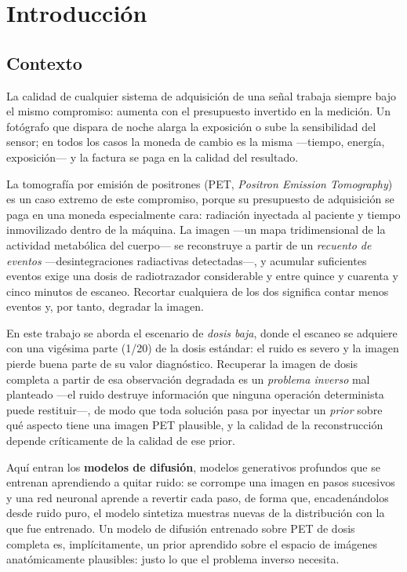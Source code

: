 \chapter{Introducción}
\label{cap:introduccion}

\section{Contexto}
\label{sec:contexto}

La calidad de cualquier sistema de adquisición de una señal trabaja
siempre bajo el mismo compromiso: aumenta con el presupuesto invertido
en la medición. Un fotógrafo que dispara de noche alarga la exposición
o sube la sensibilidad del sensor; en todos los casos la moneda de
cambio es la misma —tiempo, energía, exposición— y la factura se paga
en la calidad del resultado.

La tomografía por emisión de positrones (PET, \textit{Positron
Emission Tomography}) es un caso extremo de este compromiso, porque su
presupuesto de adquisición se paga en una moneda especialmente cara:
radiación inyectada al paciente y tiempo inmovilizado dentro de la
máquina. La imagen ---un mapa tridimensional de la actividad metabólica
del cuerpo--- se reconstruye a partir de un \emph{recuento de eventos}
---desintegraciones radiactivas detectadas---, y acumular suficientes
eventos exige una dosis de radiotrazador considerable y entre quince y
cuarenta y cinco minutos de escaneo. Recortar cualquiera de los dos
significa contar menos eventos y, por tanto, degradar la imagen.

En este trabajo se aborda el escenario de \emph{dosis baja}, donde el
escaneo se adquiere con una vigésima parte (1/20) de la dosis estándar:
el ruido es severo y la imagen pierde buena parte de su valor
diagnóstico. Recuperar la imagen de dosis completa a partir de esa
observación degradada es un \emph{problema inverso} mal planteado ---el
ruido destruye información que ninguna operación determinista puede
restituir---, de modo que toda solución pasa por inyectar un
\emph{prior} sobre qué aspecto tiene una imagen PET plausible, y la
calidad de la reconstrucción depende críticamente de la calidad de ese
prior.

Aquí entran los \textbf{modelos de difusión}, modelos generativos
profundos que se entrenan aprendiendo a quitar ruido: se corrompe una
imagen en pasos sucesivos y una red neuronal aprende a revertir cada
paso, de forma que, encadenándolos desde ruido puro, el modelo
sintetiza muestras nuevas de la distribución con la que fue entrenado.
Un modelo de difusión entrenado sobre PET de dosis completa es,
implícitamente, un prior aprendido sobre el espacio de imágenes
anatómicamente plausibles: justo lo que el problema inverso necesita.

